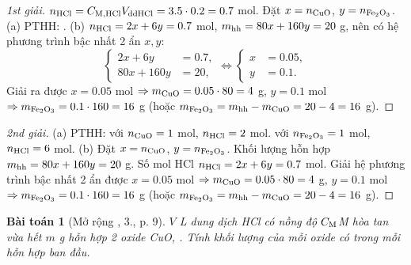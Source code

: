 \documentclass{article}
\newtheorem{baitoan}{Bài toán}
\begin{document}
\begin{proof}[1st giải]
	$n_{\rm HCl} = C_{\rm M,HCl}V_{\rm ddHCl} = 3.5\cdot0.2 = 0.7$ mol. Đặt $x = n_{\rm CuO}$, $y = n_{\ce{Fe2O3}}$. (a) PTHH: . (b) $n_{\rm HCl} = 2x + 6y = 0.7$ mol, $m_{\rm hh} = 80x + 160y = 20$ g, nên có hệ phương trình bậc nhất 2 ẩn $x,y$:
	\begin{equation*}
		\left\{\begin{split}
			2x + 6y &= 0.7,\\
			80x + 160y &= 20,
		\end{split}\right.\Leftrightarrow\left\{\begin{split}
			x &= 0.05,\\
			y &= 0.1.
		\end{split}\right.
	\end{equation*}
	Giải ra được $x = 0.05$ mol $\Rightarrow m_{\rm CuO} = 0.05\cdot80 = 4$ g, $y = 0.1$ mol $\Rightarrow m_{\ce{Fe2O3}} = 0.1\cdot160 = 16$ g (hoặc $m_{\ce{Fe2O3}} = m_{\rm hh} - m_{\rm CuO} = 20 - 4 = 16$ g).
\end{proof}

\begin{proof}[2nd giải]
	(a) PTHH:  với $n_{\rm CuO} = 1$ mol, $n_{\rm HCl} = 2$ mol.  với $n_{\ce{Fe2O3}} = 1$ mol, $n_{\rm HCl} = 6$ mol. (b) Đặt $x = n_{\rm CuO}$, $y = n_{\ce{Fe2O3}}$.  Khối lượng hỗn hợp $m_{\rm hh} = 80x + 160y = 20$ g. Số mol HCl $n_{\rm HCl} = 2x + 6y = 0.7$ mol. Giải hệ phương trình bậc nhất 2 ẩn được $x = 0.05$ mol $\Rightarrow m_{\rm CuO} = 0.05\cdot80 = 4$ g, $y = 0.1$ mol $\Rightarrow m_{\ce{Fe2O3}} = 0.1\cdot160 = 16$ g (hoặc $m_{\ce{Fe2O3}} = m_{\rm hh} - m_{\rm CuO} = 20 - 4 = 16$ g).
\end{proof}

\begin{baitoan}[Mở rộng \cite{SGK_Hoa_Hoc_9}, 3., p. 9]
	$V$ {\rm L} dung dịch {\rm HCl} có nồng độ $C_{\rm M}${\rm M} hòa tan vừa hết $m$ {\rm g} hỗn hợp 2 oxide {\rm CuO, }. Tính khối lượng của mỗi oxide có trong mỗi hỗn hợp ban đầu.
\end{baitoan}
\end{document}
